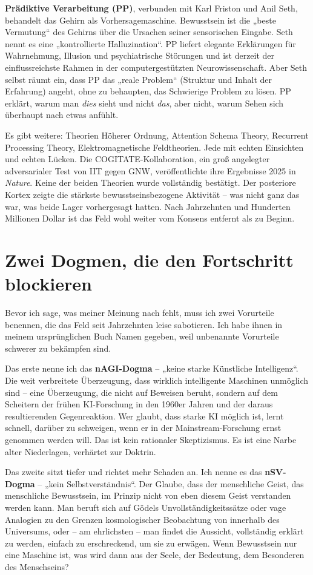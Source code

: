 \documentclass[11pt, twoside, openright]{book}
\begin{document}
\textbf{Prädiktive Verarbeitung (PP)}, verbunden mit Karl Friston und Anil Seth, behandelt das Gehirn als Vorhersagemaschine. Bewusstsein ist die „beste Vermutung“ des Gehirns über die Ursachen seiner sensorischen Eingabe. Seth nennt es eine „kontrollierte Halluzination“. PP liefert elegante Erklärungen für Wahrnehmung, Illusion und psychiatrische Störungen und ist derzeit der einflussreichste Rahmen in der computergestützten Neurowissenschaft. Aber Seth selbst räumt ein, dass PP das „reale Problem“ (Struktur und Inhalt der Erfahrung) angeht, ohne zu behaupten, das Schwierige Problem zu lösen. PP erklärt, warum man \textit{dies} sieht und nicht \textit{das}, aber nicht, warum Sehen sich überhaupt nach etwas anfühlt.

Es gibt weitere: Theorien Höherer Ordnung, Attention Schema Theory, Recurrent Processing Theory, Elektromagnetische Feldtheorien. Jede mit echten Einsichten und echten Lücken. Die COGITATE-Kollaboration, ein groß angelegter adversarialer Test von IIT gegen GNW, veröffentlichte ihre Ergebnisse 2025 in \textit{Nature}. Keine der beiden Theorien wurde vollständig bestätigt. Der posteriore Kortex zeigte die stärkste bewusstseinsbezogene Aktivität -- was nicht ganz das war, was beide Lager vorhergesagt hatten. Nach Jahrzehnten und Hunderten Millionen Dollar ist das Feld wohl weiter vom Konsens entfernt als zu Beginn.

\section*{Zwei Dogmen, die den Fortschritt blockieren}

Bevor ich sage, was meiner Meinung nach fehlt, muss ich zwei Vorurteile benennen, die das Feld seit Jahrzehnten leise sabotieren. Ich habe ihnen in meinem ursprünglichen Buch Namen gegeben, weil unbenannte Vorurteile schwerer zu bekämpfen sind.

Das erste nenne ich das \textbf{nAGI-Dogma} -- „keine starke Künstliche Intelligenz“. Die weit verbreitete Überzeugung, dass wirklich intelligente Maschinen unmöglich sind -- eine Überzeugung, die nicht auf Beweisen beruht, sondern auf dem Scheitern der frühen KI-Forschung in den 1960er Jahren und der daraus resultierenden Gegenreaktion. Wer glaubt, dass starke KI möglich ist, lernt schnell, darüber zu schweigen, wenn er in der Mainstream-Forschung ernst genommen werden will. Das ist kein rationaler Skeptizismus. Es ist eine Narbe alter Niederlagen, verhärtet zur Doktrin.

Das zweite sitzt tiefer und richtet mehr Schaden an. Ich nenne es das \textbf{nSV-Dogma} -- „kein Selbstverständnis“. Der Glaube, dass der menschliche Geist, das menschliche Bewusstsein, im Prinzip nicht von eben diesem Geist verstanden werden kann. Man beruft sich auf Gödels Unvollständigkeitssätze oder vage Analogien zu den Grenzen kosmologischer Beobachtung von innerhalb des Universums, oder -- am ehrlichsten -- man findet die Aussicht, vollständig erklärt zu werden, einfach zu erschreckend, um sie zu erwägen. Wenn Bewusstsein nur eine Maschine ist, was wird dann aus der Seele, der Bedeutung, dem Besonderen des Menschseins?
\end{document}
